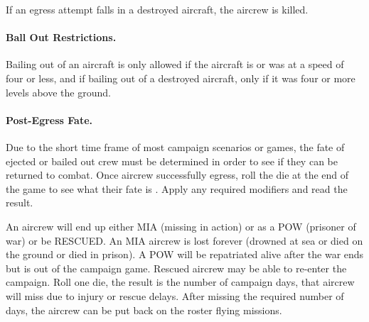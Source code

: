 \begin{advancedrules}
If an egress attempt falls in a destroyed aircraft, the aircrew is killed.

\paragraph{Ball Out Restrictions.} Bailing out of an aircraft is only allowed if the aircraft is or was at a speed of four or less, and if bailing out of a destroyed aircraft, only if it was four or more levels above the ground.


\paragraph{Post-Egress Fate.\label{rule:post-egress-fate}} Due to the short time frame of most campaign scenarios or games, the fate of ejected or bailed out crew must be determined in order to see if they can be returned to combat. Once aircrew successfully egress, roll the die at the end of the game to see what their fate is . Apply any required modifiers and read the result.

An aircrew will end up either MIA (missing in action) or as a POW (prisoner of war) or be RESCUED. An MIA aircrew is lost forever (drowned at sea or died on the ground or died in prison). A POW will be repatriated alive after the war ends but is out of the campaign game. Rescued aircrew may be able to re-enter the campaign. Roll one die, the result is the number of campaign days, that aircrew will miss due to injury or rescue delays. After missing the required number of days, the aircrew can be put back on the roster flying missions.

\end{advancedrules}
